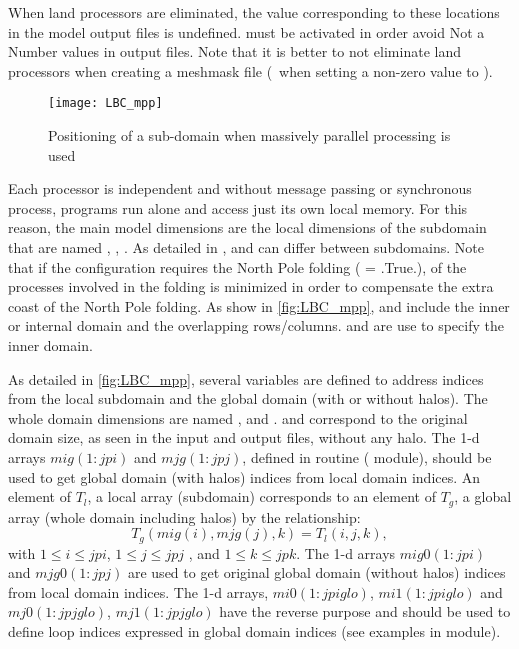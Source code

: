 \documentclass[../main/NEMO_manual]{subfiles}
\begin{document}
When land processors are eliminated, the value corresponding to these locations in the model output files is undefined.  must be activated in order avoid Not a Number values in output files. Note that it is better to not eliminate land processors when creating a meshmask file (\ie\ when setting a non-zero value to ).


\begin{figure}[h]
  \centering
  \texttt{[image: LBC\_mpp]}
  \caption{Positioning of a sub-domain when massively parallel processing is used}
  \label{fig:LBC_mpp}
\end{figure}

Each processor is independent and without message passing or synchronous process, programs run alone and access just its own local memory. For this reason, the main model dimensions are the local dimensions of the subdomain that are named , , . As detailed in \citet{Irrmann2022},  and  can differ between subdomains. Note that if the configuration requires the North Pole folding ( = .True.),  of the processes involved in the folding is minimized in order to compensate the extra coast of the North Pole folding.
As show in \autoref{fig:LBC_mpp},  and  include the inner or internal domain and the overlapping rows/columns.  and  are use to specify the inner domain.

As detailed in \autoref{fig:LBC_mpp}, several variables are defined to address indices from the local subdomain and the global domain (with or without halos). The whole domain dimensions are named ,  and .  and  correspond to the original domain size, as seen in the input and output files, without any halo. The 1-d arrays $mig(1:jpi)$ and $mjg(1:jpj)$, defined in  routine ( module), should be used to get global domain (with halos) indices from local domain indices. An element of $T_{l}$, a local array (subdomain) corresponds to an element of $T_{g}$, a global array (whole domain including halos) by the relationship:
\[
  T_{g} (mig(i),mjg(j),k) = T_{l} (i,j,k),
\]
with $1 \leq i \leq jpi$, $1  \leq j \leq jpj $ , and  $1  \leq k \leq jpk$.
The 1-d arrays $mig0(1:jpi)$ and $mjg0(1:jpj)$ are used to get original global domain (without halos) indices from local domain indices. The 1-d arrays, $mi0(1:jpiglo)$, $mi1(1:jpiglo)$ and $mj0(1:jpjglo)$, $mj1(1:jpjglo)$ have the reverse purpose and should be used to define loop indices expressed in global domain indices (see examples in  module).\\
\end{document}
